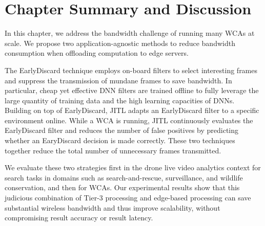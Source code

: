 \section{Chapter Summary and Discussion}
\label{bw:discussion}

In this chapter, we address the bandwidth challenge of running many WCAs at
scale. We propose two application-agnostic methods to reduce bandwidth
consumption when offloading computation to edge servers. 

The EarlyDiscard technique employs on-board filters to select interesting frames
and suppress the transmission of mundane frames to save bandwidth. In
particular, cheap yet effective DNN filters are trained offline to fully
leverage the large quantity of training data and the high learning capacities of
DNNs. Building on top of EarlyDiscard, JITL adapts an EarlyDiscard filter to a
specific environment online. While a WCA is running, JITL continuously evaluates
the EarlyDiscard filter and reduces the number of false positives by predicting
whether an EaryDiscard decision is made correctly. These two techniques together
reduce the total number of unnecessary frames transmitted. 

We evaluate these two strategies first in the drone live video analytics context
for search tasks in domains such as search-and-rescue, surveillance, and
wildlife conservation, and then for WCAs. Our experimental results show that
this judicious combination of Tier-3 processing and edge-based processing can
save substantial wireless bandwidth and thus improve scalability, without
compromising result accuracy or result latency. 
